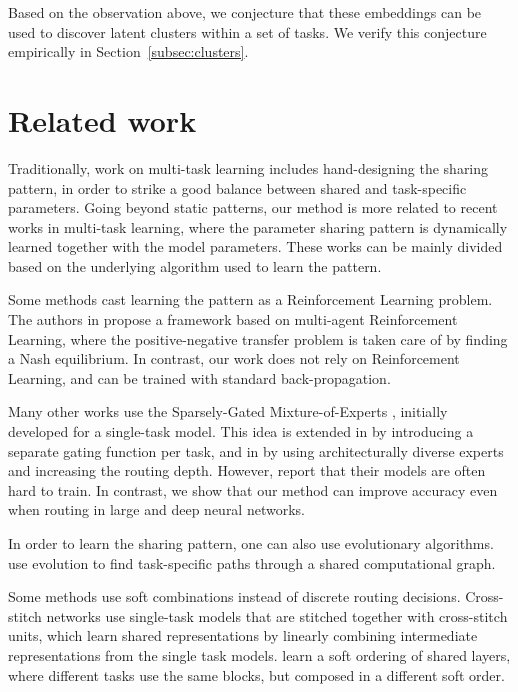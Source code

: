 \documentclass[conference]{IEEEtran}
\begin{document}
Based on the observation above, we conjecture that these embeddings can be used to discover latent clusters within a set of tasks. We verify this conjecture empirically in Section~\ref{subsec:clusters}.

\section{Related work}\label{sec:related_work}

Traditionally, work on multi-task learning includes hand-designing the sharing pattern, in order to strike a good balance between shared and task-specific parameters. 
Going beyond static patterns, our method is more related to recent works in multi-task learning, where the parameter sharing pattern is dynamically learned together with the model parameters. These works can be mainly divided based on the underlying algorithm  used to learn the pattern.

Some methods cast learning the pattern as a Reinforcement Learning problem. The authors in \cite{RoutingNetworks18, RoutingNetsChallenges} propose a framework based on multi-agent Reinforcement Learning, where the positive-negative transfer problem is taken care of by finding a Nash equilibrium. In contrast, our work does not rely on Reinforcement Learning, and can be trained with standard back-propagation.

Many other works use the Sparsely-Gated Mixture-of-Experts \cite{Shazeer-MoE-2017}, initially developed for a single-task model. This idea is extended in \cite{MMoE-KDD-2018} by introducing a separate gating function per task, and in \cite{Diversity&Depth-ICLR-2019} by using architecturally diverse experts and increasing the routing depth. However, \cite{Diversity&Depth-ICLR-2019} report that their models are often hard to train. In contrast, we show that our method can improve accuracy even when routing in large and deep neural networks.

In order to learn the sharing pattern, one can also use evolutionary algorithms. \cite{Fernando2017-Pathnet} use evolution to find task-specific paths through a shared computational graph.

Some methods use soft combinations instead of discrete routing decisions. Cross-stitch networks \cite{CrossStichNetworks} use single-task models that are stitched together with cross-stitch units, which learn shared representations by linearly combining intermediate representations from the single task models. \cite{MeyerMiikk-ICLR-2018} learn a soft ordering of shared layers, where different tasks use the same blocks, but composed in a different soft order.
\end{document}
